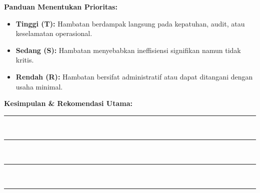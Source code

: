 \documentclass[12pt,a4paper]{report}
\newcommand{\writespace}[1][2cm]{\rule{0pt}{#1}}
\begin{document}
\noindent
{}

\vspace{0.3cm}

\vspace{0.5cm}

\begin{tipbox}
\textbf{Panduan Menentukan Prioritas:}
\begin{itemize}
    \item \textbf{Tinggi (T):} Hambatan berdampak langsung pada kepatuhan, audit, atau keselamatan operasional.
    \item \textbf{Sedang (S):} Hambatan menyebabkan ineffisiensi signifikan namun tidak kritis.
    \item \textbf{Rendah (R):} Hambatan bersifat administratif atau dapat ditangani dengan usaha minimal.
\end{itemize}
\end{tipbox}

\vspace{0.3cm}

\noindent\textbf{Kesimpulan \& Rekomendasi Utama:}\\[0.2cm]
\noindent\rule{\textwidth}{0.3pt}\writespace[0.8cm]\\
\noindent\rule{\textwidth}{0.3pt}\writespace[0.8cm]\\
\noindent\rule{\textwidth}{0.3pt}\writespace[0.8cm]\\
\noindent\rule{\textwidth}{0.3pt}
\end{document}
